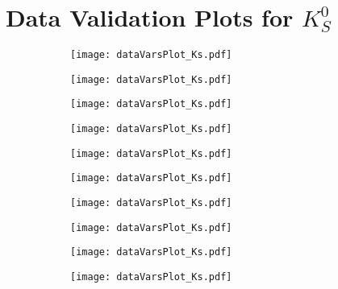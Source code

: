 \chapter{Data Validation Plots for $K_S^0$}

\begin{figure}[H]
\caption{The distribution of the training variables in KsFinder. The blue and purple solid lines are the total and true $K_S^0$ distributions from generic MC, respectively. The yellow and red dots are the data distribution before and after applying KsFinder cut. The uncertainties in data are taken as three times the Poisson standard deviation.}
\begin{subfigure}{0.5\linewidth}
\texttt{[image: dataVarsPlot\_Ks.pdf]}
\end{subfigure}
\begin{subfigure}{0.5\linewidth}
\texttt{[image: dataVarsPlot\_Ks.pdf]}
\end{subfigure}
\end{figure}

\begin{figure}[H]
\ContinuedFloat
\begin{subfigure}{0.5\linewidth}
	\texttt{[image: dataVarsPlot\_Ks.pdf]}
\end{subfigure}
\begin{subfigure}{0.5\linewidth}
	\texttt{[image: dataVarsPlot\_Ks.pdf]}
\end{subfigure}
\begin{subfigure}{0.5\linewidth}
	\texttt{[image: dataVarsPlot\_Ks.pdf]}
\end{subfigure}
\begin{subfigure}{0.5\linewidth}
	\texttt{[image: dataVarsPlot\_Ks.pdf]}
\end{subfigure}
\end{figure}

\begin{figure}[H]
\ContinuedFloat
\begin{subfigure}{0.5\linewidth}
	\texttt{[image: dataVarsPlot\_Ks.pdf]}
\end{subfigure}
\begin{subfigure}{0.5\linewidth}
	\texttt{[image: dataVarsPlot\_Ks.pdf]}
\end{subfigure}
\begin{subfigure}{0.5\linewidth}
	\texttt{[image: dataVarsPlot\_Ks.pdf]}
\end{subfigure}
\begin{subfigure}{0.5\linewidth}
\texttt{[image: dataVarsPlot\_Ks.pdf]}
\end{subfigure}
\end{figure}


